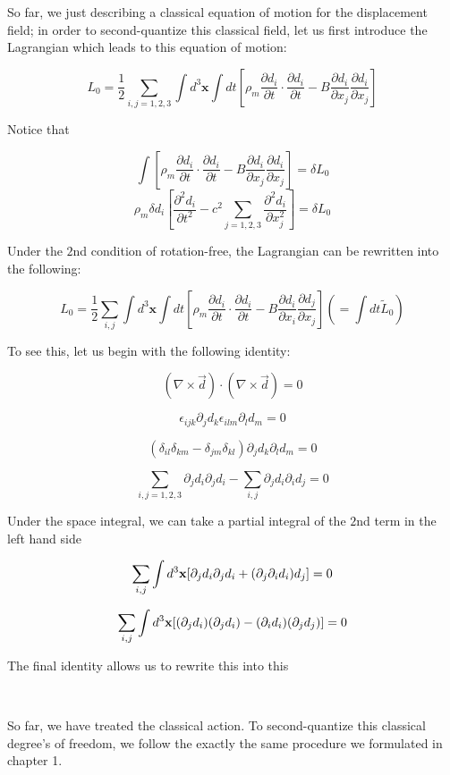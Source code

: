 So far, we just describing a classical equation of motion for the displacement field; in order to second-quantize this classical field, let us first introduce the Lagrangian which leads to this equation of motion:

\[L_0 = \frac{1}{2}\sum_{i,j=1,2,3}\int d^3\bm{x}\int dt\left[\rho_m\frac{\partial d_i}{\partial t}\cdot\frac{\partial d_i}{\partial t} - B\frac{\partial d_i}{\partial x_j}\frac{\partial d_i}{\partial x_j}\right]\]

Notice that

\[\int \left[\rho_m\frac{\partial d_i}{\partial t}\cdot\frac{\partial d_i}{\partial t} - B\frac{\partial d_i}{\partial x_j}\frac{\partial d_i}{\partial x_j}\right] = \delta L_0\]
\[\rho_m\delta d_i\left[\frac{\partial^2 d_i}{\partial t^2} - c^2\sum_{j = 1,2,3}\frac{\partial^2 d_i}{\partial x_j^2}\right] = \delta L_0 \]

Under the $2$nd condition of rotation-free, the Lagrangian can be rewritten into the following:

\[L_0 = \frac{1}{2}\sum_{i,j}\int d^3\bm{x}\int dt \left[\rho_m\frac{\partial d_i}{\partial t}\cdot\frac{\partial d_i}{\partial t} - B\frac{\partial d_i}{\partial x_i}\frac{\partial d_j}{\partial x_j}\right] (=\int dt \tilde{L}_0) \]

To see this, let us begin with the following identity:

\[(\nabla\times\vec{d})\cdot(\nabla\times\vec{d}) = 0 \]

\[\epsilon_{ijk}\partial_j d_k\epsilon_{ilm}\partial_l d_m = 0 \]

\[(\delta_{il}\delta_{km} - \delta_{jm}\delta_{kl})\partial_j d_k\partial_l d_m = 0 \]

\[\sum_{i,j = 1,2,3} \partial_j d_i \partial_j d_i - \sum_{i,j}\partial_j d_i \partial_i d_j = 0 \]

Under the space integral, we can take a partial integral of the $2$nd term in the left hand side

\[\sum_{i,j}\int d^3{\bf x}[\partial_j d_i\partial_j d_i+(\partial_j\partial_i d_i)d_j] = 0 \]

\[\sum_{i,j}\int d^3{\bf x}[(\partial_j d_i)(\partial_j d_i) - (\partial_i d_i)(\partial_j d_j)] = 0 \]

The final identity allows us to rewrite this into this

\dotfill

\ 

So far, we have treated the classical action. To second-quantize this classical degree's of freedom, we follow the exactly the same procedure we formulated in chapter 1. 


